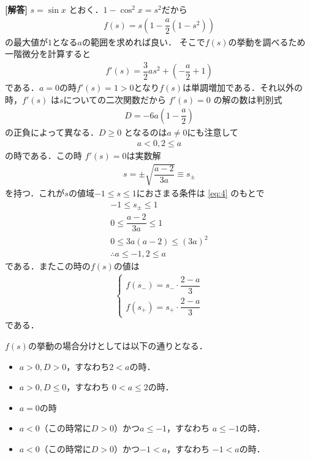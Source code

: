 \documentclass[../../main.tex]{subfiles}
\begin{document}
\begin{oframed}
  
\end{oframed}


{\bf [解答]}
$s=\sin x$ とおく．$1-\cos^2x =s^2$だから
\begin{align}
  f(s)=s\left(1-\dfrac{a}{2}(1-s^2)\right) \label{eq:1}
\end{align}
の最大値が$1$となる$a$の範囲を求めれば良い．
そこで$f(s)$の挙動を調べるため一階微分を計算すると
\begin{align}
  f'(s)=\dfrac{3}{2}as^2+\left(-\dfrac{a}{2}+1\right) \label{eq:2}
\end{align}
である．$a=0$の時$f'(s)=1>0$となり$f(s)$は単調増加である．それ以外の時，$f'(s)$ は$s$についての二次関数だから $f'(s)=0$ の解の数は判別式
\begin{align}
  D = -6a\left(1-\dfrac{a}{2}\right) \label{eq:3}
\end{align}
の正負によって異なる．$D\ge 0$ となるのは$a\neq 0$にも注意して
\begin{align}
  a < 0, 2 \le a \label{eq:4}
\end{align}
の時である．この時 $f'(s)=0$は実数解
\begin{align}
  s = \pm \sqrt{\dfrac{a-2}{3a}} \equiv s_{\pm} \label{eq:5}
\end{align}
を持つ．これが$s$の値域$-1\le s \le 1$におさまる条件は \cref{eq:4} のもとで
\begin{align}
  -1 \le s_{\pm} \le 1 \\
  0 \le \dfrac{a-2}{3a} \le 1 \\
  0 \le 3a (a-2) \le (3a)^2 \\
  \therefore
  a \le -1, 2 \le a \label{eq:6}
\end{align}
である．またこの時の$f(s)$の値は
\begin{align}
  \begin{cases}
    f(s_{-})=s_{-}\cdot\dfrac{2-a}{3} \\
    f(s_{+})=s_{+}\cdot\dfrac{2-a}{3}
  \end{cases} \label{eq:7}
\end{align}
である．

$f(s)$の挙動の場合分けとしては以下の通りとなる．
\begin{itemize}
  \item $a>0, D > 0$，すなわち$2<a$の時．
  \item $a>0, D \le 0$，すなわち $0 < a \le 2$の時．
  \item $a=0$の時
  \item $a<0$（この時常に$D>0$）かつ$a \le -1$，すなわち $a \le -1$の時．
  \item $a<0$（この時常に$D>0$）かつ$-1 < a$，すなわち $-1 < a$の時．
\end{itemize}
\end{document}
